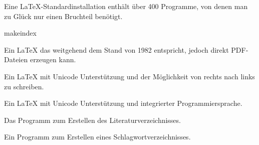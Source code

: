 
Eine \LaTeX{}-Standardinstallation enthält über 400 Programme, von denen man zu Glück nur einen Bruchteil benötigt.

\begin{labeling}{makeindex}
\item[\Program{pdflatex}] Ein \LaTeX{} das weitgehend dem Stand von 1982 entspricht, jedoch direkt PDF-Dateien erzeugen kann.
\item[\Program{xelatex}] Ein \LaTeX{} mit Unicode Unterstützung und der Möglichkeit von rechts nach links zu schreiben.
\item[\Program{lualatex}] Ein \LaTeX{} mit Unicode Unterstützung und integrierter Programmiersprache.
\item[\Program{biber}] Das Programm zum Erstellen des Literaturverzeichnisses.
\item[\Program{makeindex}] Ein Programm zum Erstellen eines Schlagwortverzeichnisses.
\end{labeling}


